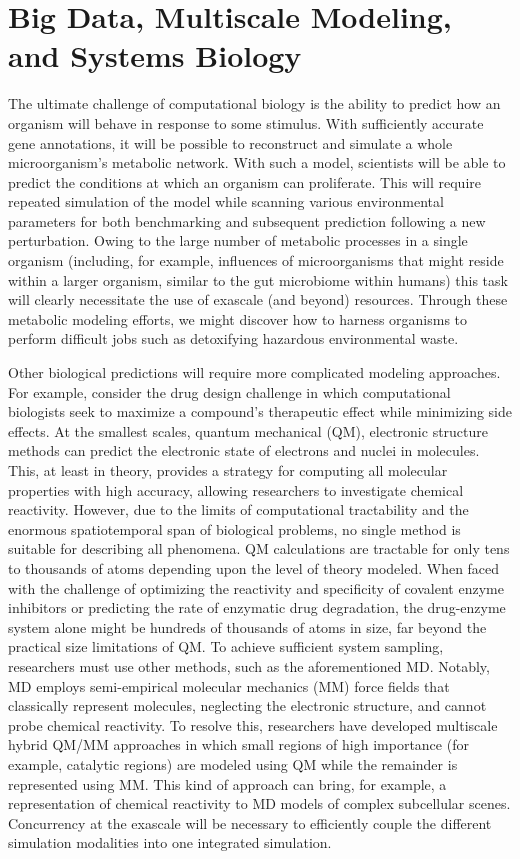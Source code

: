 \section{Big Data, Multiscale Modeling, and Systems Biology}

\par The ultimate challenge of computational biology is the ability to predict how an organism will behave in response to some stimulus. With sufficiently accurate gene annotations, it will be possible to reconstruct and simulate a whole microorganism's metabolic network. With such a model, scientists will be able to predict the conditions at which an organism can proliferate. This will require repeated simulation of the model while scanning various environmental parameters for both benchmarking and subsequent prediction following a new perturbation. Owing to the large number of metabolic processes in a single organism (including, for example, influences of microorganisms that might reside within a larger organism, similar to the gut microbiome within humans) this task will clearly necessitate the use of exascale (and beyond) resources. Through these metabolic modeling efforts, we might discover how to harness organisms to perform difficult jobs such as detoxifying hazardous environmental waste.
\par Other biological predictions will require more complicated modeling approaches. For example, consider the drug design challenge in which computational biologists seek to maximize a compound's therapeutic effect while minimizing side effects\cite{Amaro2018}. At the smallest scales, quantum mechanical (QM), electronic structure methods can predict the electronic state of electrons and nuclei in molecules. This, at least in theory, provides a strategy for computing all molecular properties with high accuracy, allowing researchers to investigate chemical reactivity. However, due to the limits of computational tractability and the enormous spatiotemporal span of biological problems, no single method is suitable for describing all phenomena. QM calculations are tractable for only tens to thousands of atoms depending upon the level of theory modeled. When faced with the challenge of optimizing the reactivity and specificity of covalent enzyme inhibitors or predicting the rate of enzymatic drug degradation, the drug-enzyme system alone might be hundreds of thousands of atoms in size, far beyond the practical size limitations of QM. To achieve sufficient system sampling, researchers must use other methods, such as the aforementioned MD. Notably, MD employs semi-empirical molecular mechanics (MM) force fields that classically represent molecules, neglecting the electronic structure, and cannot probe chemical reactivity. To resolve this, researchers have developed multiscale hybrid QM/MM approaches in which small regions of high importance (for example, catalytic regions) are modeled using QM while the remainder is represented using MM\cite{VanderKamp2013a}. This kind of approach can bring, for example, a representation of chemical reactivity to MD models of complex subcellular scenes. Concurrency at the exascale will be necessary to efficiently couple the different simulation modalities into one integrated simulation.
